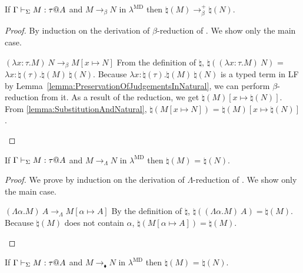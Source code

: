 \begin{lemma}
    \label{lemma:PreservationOfBetaReductionInNatural}
    If $\G \V M:\tau@A$ and $M \longrightarrow_\beta N$ in $\lambda^{\text{MD}}$
    then $\natural(M) \longrightarrow_\beta^+ \natural(N)$.
\end{lemma}

\begin{proof}
    By induction on the derivation of $\beta$-reduction of \LMD.
    We show only the main case.
    \newcommand{\R}{\longrightarrow_{\beta}}
    \begin{rneqncase}{$(\lambda x:\tau.M)\ N \R M[x \mapsto N]$}{}
        From the definition of $\natural$, $\natural((\lambda x:\tau.M)\ N)$ =
        $\lambda x:\natural(\tau).\natural(M)\ \natural(N)$.  Because $\lambda
        x:\natural(\tau).\natural(M)\ \natural(N)$ is a typed term in LF by
        Lemma~\ref{lemma:PreservationOfJudgementsInNatural}, we can perform
        $\beta$-reduction from it.  As a result of the reduction, we get
        $\natural(M)[x\mapsto\natural(N)]$.  From
        \ref{lemma:SubstitutionAndNatural}, $\natural(M[x \mapsto N])$ =
        $\natural(M)[x\mapsto\natural(N)]$.
    \end{rneqncase}
\end{proof}

\begin{lemma}
    \label{lemma:PreservationOfLambdaReductionInNatural}
    If $\G \V M:\tau@A$ and $M \longrightarrow_\Lambda N$ in $\lambda^{\text{MD}}$
    then $\natural(M)$ =  $\natural(N)$.
\end{lemma}

\begin{proof}
    We prove by induction on the derivation of $\Lambda$-reduction of \LMD.
    We show only the main case.
    \begin{rneqncase}{\( (\Lambda\alpha.M)\ A \longrightarrow_\Lambda M[\alpha\mapsto A] \)}{}
            By the definition of $\natural$, \(\natural((\Lambda\alpha.M)\ A) =
            \natural(M)\).  Because \(\natural(M)\) does not contain
            \(\alpha\), \(\natural(M[\alpha\mapsto A]) = \natural(M)\).
    \end{rneqncase}
\end{proof}

\begin{lemma}
    \label{lemma:PreservationOfBlacklozengeReductionInNatural}
    If $\G \V M:\tau@A$ and ${M \longrightarrow_\blacklozenge N}$ in $\lambda^{\text{MD}}$
    then $\natural(M)$ =  $\natural(N)$.
\end{lemma}

